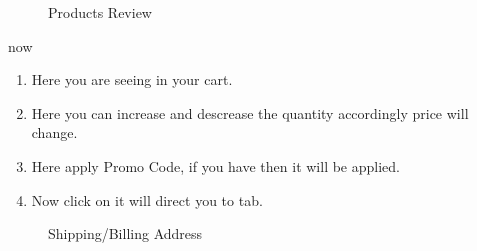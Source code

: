 \documentclass[a4paper,10pt,english]{report}
\begin{document}
\begin{figure}[htbp]
\centering
\capstart

\noindent{}
\caption{Products Review}\label{\detokenize{index:id15}}\label{\detokenize{index:id5}}\end{figure}

now
\begin{enumerate}
\def\theenumi{\alph{enumi}}
\def\labelenumi{\theenumi .}
\makeatletter\def\p@enumii{\p@enumi \theenumi .}\makeatother
\item {} 
Here you are seeing  in your cart.

\item {} 
Here you can increase and descrease the quantity accordingly price will change.

\item {} 
Here apply Promo Code, if you have then it will be applied.

\item {} 
Now click on  it will direct you to  tab.

\end{enumerate}

\begin{figure}[htbp]
\centering
\capstart

\noindent{}
\caption{Shipping/Billing Address}\label{\detokenize{index:id16}}\label{\detokenize{index:id6}}\end{figure}
\end{document}
